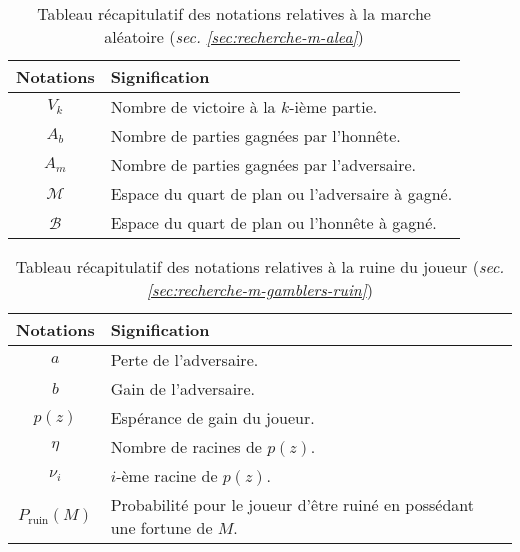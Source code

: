 \begin{table}[htb!]
	\centering
	\begin{tabular}{|c||M{13cm}|}
		\hline
			\textbf{Notations} & \textbf{Signification} \tabularnewline
		\hline			
			$V_k$ & Nombre de victoire à la $k$-ième partie. \tabularnewline
			$A_b$ & Nombre de parties gagnées par l'honnête. \tabularnewline
			$A_m$ & Nombre de parties gagnées par l'adversaire. \tabularnewline
			$\mathcal{M}$ & Espace du quart de plan ou l'adversaire à gagné.
			\tabularnewline
			$\mathcal{B}$ & Espace du quart de plan ou l'honnête à gagné.
			\tabularnewline
		\hline
	\end{tabular}
	\caption{Tableau récapitulatif des notations relatives à la marche aléatoire
	(\textit{sec. \ref{sec:recherche-m-alea}})}
	\label{tab:notations-walk}
\end{table}

\newpage

\begin{table}[t!]
	\centering
	\begin{tabular}{|c||M{13cm}|}
		\hline
			\textbf{Notations} & \textbf{Signification} \tabularnewline
		\hline
			$a$ & Perte de l'adversaire. \tabularnewline
			$b$ & Gain de l'adversaire.\tabularnewline
			$p(z)$ & Espérance de gain du joueur.\tabularnewline
			$\eta$ & Nombre de racines de $p(z)$.\tabularnewline
			$\nu_i$ & $i$-ème racine de $p(z)$. \tabularnewline
			$P_{\text{ruin}}(M)$ & Probabilité pour le joueur d'être ruiné en
			possédant une fortune de $M$. \tabularnewline
		\hline
	\end{tabular}
	\caption{Tableau récapitulatif des notations relatives à la ruine du joueur
	(\textit{sec. \ref{sec:recherche-m-gamblers-ruin}})}
	\label{tab:notations-gambler}
	\vspace*{7in}
\end{table}